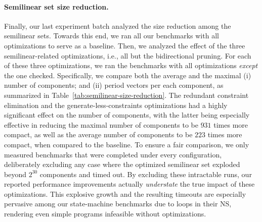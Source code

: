 





\paragraph{Semilinear set size reduction.}

Finally, our last experiment batch analyzed the size reduction among the semilinear sets.
%
Towards this end, we ran all our benchmarks with all optimizations to serve as a baseline. 
%
Then, we analyzed the effect of the three semilinear-related optimizations, i.e., all but the bidirectional pruning. For each of these three optimizations, we ran the benchmarks with all optimizations \textit{except} the one checked.
%
%
Specifically, we compare both the average and the maximal (i) number of components; and (ii) period vectors per each component, as summarized in Table~\ref{tab:semilinear-size-reduction}.
%
The redundant constraint elimination and the generate-less-constraints optimizations had a highly significant effect on the number of components, with the latter being especially effective in reducing the maximal number of components to be $931$ times more compact, as well as the average number of components to be $223$ times more compact, when compared to the baseline.
%
To ensure a fair comparison, we only measured benchmarks that were completed under every configuration, deliberately excluding any case where the optimized semilinear set exploded beyond $2^{30}$ components and timed out. By excluding these intractable runs, our reported performance improvements actually \textit{understate} the true impact of these optimizations. This explosive growth and the resulting timeouts are especially pervasive among our state-machine benchmarks due to loops in their NS, rendering even simple programs infeasible without optimizations.



